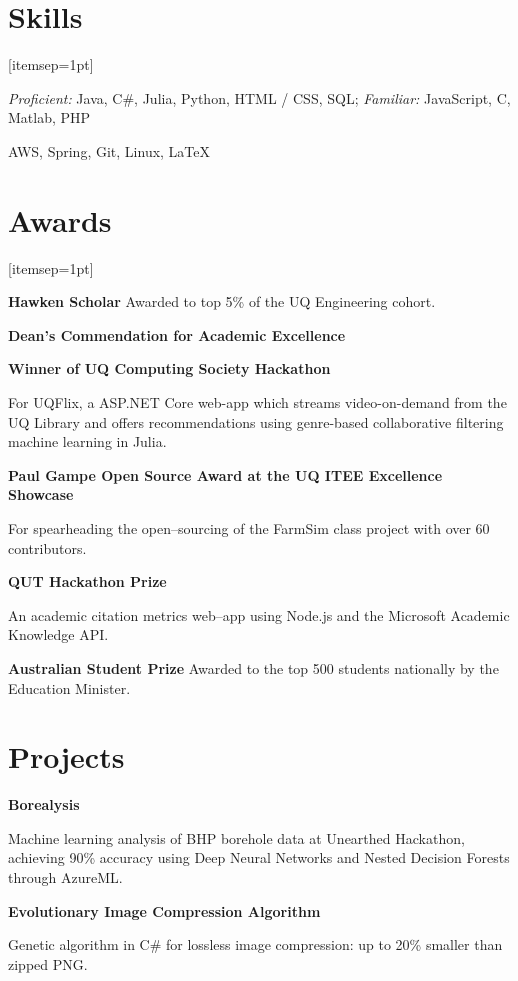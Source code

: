 \documentclass[a4paper]{article}
\renewenvironment{itemize}{
  \begin{list}{}{
    \setlength{\leftmargin}{1.5em}
  }
}{
  \end{list}
}
\newcommand{\dateitem}[1] {\item[\textbf{#1 :}]}
\newcommand{\resumesection}[1]{\section*{\accentcolour #1}}
\newcommand{\accentcolour}{\color{NavyBlue}}
\begin{document}
\resumesection{Skills}
\begin{itemize}[itemsep=1pt]
	\dateitem{Languages} {
%		

	\textit{Proficient:} Java, C\#, Julia, Python, HTML / CSS, SQL;
	\textit{Familiar:} JavaScript, C, Matlab, PHP
	}
	\dateitem{Technologies} {
		AWS, Spring, Git, Linux, \LaTeX
	}
\end{itemize}

\resumesection{Awards}
\begin{itemize}[itemsep=1pt]
	\dateitem{2017 -- 2019} {\textbf{Hawken Scholar} Awarded to top 5\% of the UQ Engineering cohort.
	}
	\dateitem{2016 -- 2017} \textbf{Dean's Commendation for Academic Excellence}
	\dateitem{2016} {\textbf{Winner of UQ Computing Society Hackathon}
		
		For UQFlix, a ASP.NET Core web-app which streams video-on-demand from the UQ Library and offers recommendations using genre-based collaborative filtering machine learning in Julia.
	}
	\dateitem{2015} {\textbf{Paul Gampe Open Source Award at the UQ ITEE Excellence Showcase}
		
		For spearheading the open--sourcing of the FarmSim class project with over 60 contributors.
	}

	\dateitem{2015} {\textbf{QUT Hackathon Prize}
		
		
		An academic citation metrics web--app using Node.js and the Microsoft Academic Knowledge API.
		
	}
	\dateitem{2013} {\textbf{Australian Student Prize} Awarded to the top 500 students nationally by the Education Minister.
	}
\end{itemize}

\resumesection{Projects}
\begin{itemize}	
	\dateitem{2016} {\textbf{Borealysis}
		
		Machine learning analysis of BHP borehole data at Unearthed Hackathon, achieving 90\% accuracy using Deep Neural Networks and Nested Decision Forests through AzureML.
	}
	
	\dateitem{2013} {\textbf{Evolutionary Image Compression Algorithm}
		
		Genetic algorithm in C\# for lossless image compression: up to 20\% smaller than zipped PNG.
	}
\end{itemize}

\bigskip
\end{document}
